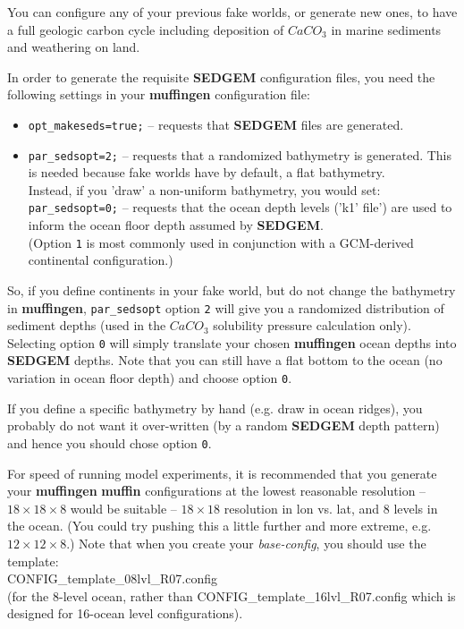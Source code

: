 You can configure any of your previous fake worlds, or generate new ones, to have a full geologic carbon cycle including deposition of \(CaCO_{3}\) in marine sediments and weathering on land.

In order to generate the requisite \textbf{SEDGEM} configuration files, you need the following settings in your \textbf{muffingen} configuration file:

\begin{itemize}[noitemsep]
\vspace{1mm}
\item \texttt{opt\_makeseds=true;} --  requests that \textbf{SEDGEM} files are generated.
\vspace{1mm}
\item \texttt{par\_sedsopt=2;} -- requests that a randomized bathymetry is generated. This is needed because fake worlds have by default, a flat bathymetry.
\\Instead, if you 'draw' a non-uniform bathymetry, you would set:
\\ \texttt{par\_sedsopt=0;} -- requests that the ocean depth levels ('k1' file') are used to inform the ocean floor depth assumed by \textbf{SEDGEM}.
\\(Option \texttt{1} is most commonly used in conjunction with a GCM-derived continental configuration.)
\end{itemize}

\vspace{1mm}
So, if you define continents in your fake world, but do not change the bathymetry in \textbf{muffingen}, \texttt{par\_sedsopt} option \texttt{2} will give you a randomized distribution of sediment depths (used in the \(CaCO_{3}\) solubility pressure calculation only). Selecting option \texttt{0} will simply translate your chosen \textbf{muffingen} ocean depths into \textbf{SEDGEM} depths. Note that you can still have a flat bottom to the ocean (no variation in ocean floor depth) and choose option \texttt{0}.

If you define a specific bathymetry by hand (e.g. draw in ocean ridges), you probably do not want it over-written (by a random \textbf{SEDGEM} depth pattern) and hence you should chose option \texttt{0}.

For speed of running model experiments, it is recommended that you generate your \textbf{muffingen} \textbf{muffin} configurations at the lowest reasonable resolution -- \(18\times18\times8\) would be suitable -- \(18\times18\) resolution in lon vs. lat, and \(8\) levels in the ocean. (You could try pushing this a little further and more extreme, e.g. \(12\times12\times8\).) Note that when you create your \textit{base-config}, you should use the template:
\vspace{1mm}
\\\textsf{\footnotesize CONFIG\_template\_08lvl\_R07.config}
\vspace{1mm}
\\(for the 8-level ocean, rather than \textsf{\footnotesize CONFIG\_template\_16lvl\_R07.config } which is designed for 16-ocean level configurations).

